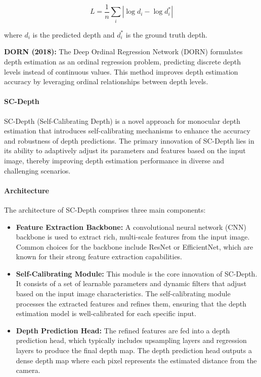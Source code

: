 \documentclass[12pt]{article}
\begin{document}
\[
L = \frac{1}{n} \sum_{i} \left| \log d_i - \log d_i^* \right|
\]

where \( d_i \) is the predicted depth and \( d_i^* \) is the ground truth depth.

\textbf{DORN (2018):} The Deep Ordinal Regression Network (DORN) formulates depth estimation as an ordinal regression problem, predicting discrete depth levels instead of continuous values. This method improves depth estimation accuracy by leveraging ordinal relationships between depth levels.

\paragraph{SC-Depth}

SC-Depth (Self-Calibrating Depth) is a novel approach for monocular depth estimation that introduces self-calibrating mechanisms to enhance the accuracy and robustness of depth predictions. The primary innovation of SC-Depth lies in its ability to adaptively adjust its parameters and features based on the input image, thereby improving depth estimation performance in diverse and challenging scenarios.

\paragraph{Architecture}

The architecture of SC-Depth comprises three main components:

\begin{itemize}
    \item \textbf{Feature Extraction Backbone:} A convolutional neural network (CNN) backbone is used to extract rich, multi-scale features from the input image. Common choices for the backbone include ResNet or EfficientNet, which are known for their strong feature extraction capabilities.
    
    \item \textbf{Self-Calibrating Module:} This module is the core innovation of SC-Depth. It consists of a set of learnable parameters and dynamic filters that adjust based on the input image characteristics. The self-calibrating module processes the extracted features and refines them, ensuring that the depth estimation model is well-calibrated for each specific input.
    
    \item \textbf{Depth Prediction Head:} The refined features are fed into a depth prediction head, which typically includes upsampling layers and regression layers to produce the final depth map. The depth prediction head outputs a dense depth map where each pixel represents the estimated distance from the camera.
\end{itemize}
\end{document}
